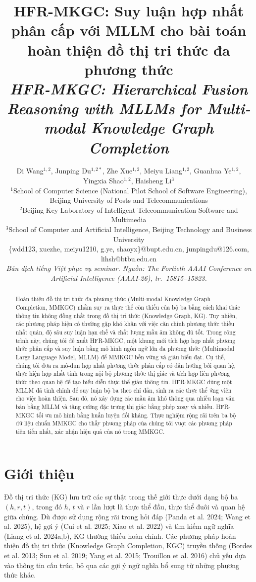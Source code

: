 \documentclass[10pt,twocolumn,a4paper]{article}
\title{\textbf{HFR-MKGC: Suy luận hợp nhất phân cấp với MLLM cho bài toán hoàn thiện đồ thị tri thức đa phương thức}\\[4pt]
\large\textit{HFR-MKGC: Hierarchical Fusion Reasoning with MLLMs for Multi-modal Knowledge Graph Completion}}
\author{Di Wang$^{1,2}$, Junping Du$^{1,2*}$, Zhe Xue$^{1,2}$, Meiyu Liang$^{1,2}$, Guanhua Ye$^{1,2}$, Yingxia Shao$^{1,2}$, Haisheng Li$^{3}$\\[3pt]
\small $^1$School of Computer Science (National Pilot School of Software Engineering), Beijing University of Posts and Telecommunications\\
\small $^2$Beijing Key Laboratory of Intelligent Telecommunication Software and Multimedia\\
\small $^3$School of Computer and Artificial Intelligence, Beijing Technology and Business University\\[3pt]
\small \{wdd123, xuezhe, meiyu1210, g.ye, shaoyx\}@bupt.edu.cn, junpingdu@126.com, lihsh@btbu.edu.cn\\[4pt]
\small\textit{Bản dịch tiếng Việt phục vụ seminar. Nguồn: The Fortieth AAAI Conference on Artificial Intelligence (AAAI-26), tr.~15815--15823.}}
\date{}
\begin{document}
\maketitle

\begin{abstract}
\noindent
Hoàn thiện đồ thị tri thức đa phương thức (Multi-modal Knowledge Graph Completion, MMKGC) nhằm suy ra thực thể còn thiếu của bộ ba bằng cách khai thác thông tin không đồng nhất trong đồ thị tri thức (Knowledge Graph, KG). Tuy nhiên, các phương pháp hiện có thường gặp khó khăn với việc căn chỉnh phương thức thiếu nhất quán, độ sâu suy luận hạn chế và chất lượng mẫu âm không đủ tốt. Trong công trình này, chúng tôi đề xuất HFR-MKGC, một khung mới tích hợp hợp nhất phương thức phân cấp và suy luận bằng mô hình ngôn ngữ lớn đa phương thức (Multimodal Large Language Model, MLLM) để MMKGC bền vững và giàu biểu đạt. Cụ thể, chúng tôi đưa ra mô-đun hợp nhất phương thức phân cấp có dẫn hướng bởi quan hệ, thực hiện hợp nhất tinh trong nội bộ phương thức thị giác và tích hợp liên phương thức theo quan hệ để tạo biểu diễn thực thể giàu thông tin. HFR-MKGC dùng một MLLM đã tinh chỉnh để suy luận bộ ba theo chỉ dẫn, sinh ra các thực thể ứng viên cho việc hoàn thiện. Sau đó, nó xây dựng các mẫu âm khó thông qua nhiễu loạn văn bản bằng MLLM và tăng cường đặc trưng thị giác bằng phép xoay và nhiễu. HFR-MKGC tối ưu mô hình bằng huấn luyện đối kháng. Thực nghiệm rộng rãi trên ba bộ dữ liệu chuẩn MMKGC cho thấy phương pháp của chúng tôi vượt các phương pháp tiên tiến nhất, xác nhận hiệu quả của nó trong MMKGC.
\end{abstract}

\section{Giới thiệu}

Đồ thị tri thức (KG) lưu trữ các sự thật trong thế giới thực dưới dạng bộ ba $(h, r, t)$, trong đó $h$, $t$ và $r$ lần lượt là thực thể đầu, thực thể đuôi và quan hệ giữa chúng. Dù được sử dụng rộng rãi trong hỏi đáp (Panda et al. 2024; Wang et al. 2025), hệ gợi ý (Cui et al. 2025; Xiao et al. 2022) và tìm kiếm ngữ nghĩa (Liang et al. 2024a,b), KG thường thiếu hoàn chỉnh. Các phương pháp hoàn thiện đồ thị tri thức (Knowledge Graph Completion, KGC) truyền thống (Bordes et al. 2013; Sun et al. 2019; Yang et al. 2015; Trouillon et al. 2016) chủ yếu dựa vào thông tin cấu trúc, bỏ qua các gợi ý ngữ nghĩa bổ sung từ những phương thức khác.
\end{document}
